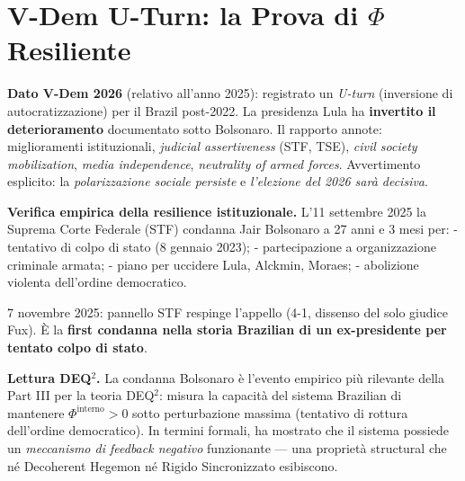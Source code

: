 \section{\texorpdfstring{V-Dem U-Turn: la Prova di \(\Phi\)
Resiliente}{V-Dem U-Turn: la Prova di \textbackslash Phi Resiliente}}\label{v-dem-u-turn-la-prova-di-phi-resilient}

\Proved{} \textbf{Dato V-Dem 2026} (relativo all'anno 2025): registrato
un \emph{U-turn} (inversione di autocratizzazione) per il Brazil
post-2022. La presidenza Lula ha \textbf{invertito il deterioramento}
documentato sotto Bolsonaro. Il rapporto annote: miglioramenti
istituzionali, \emph{judicial assertiveness} (STF, TSE), \emph{civil
society mobilization}, \emph{media independence}, \emph{neutrality of
armed forces}. Avvertimento esplicito: la \emph{polarizzazione sociale
persiste} e \emph{l'elezione del 2026 sarà decisiva}.

\Proved{} \textbf{Verifica empirica della resilience istituzionale.}
L'11 settembre 2025 la Suprema Corte Federale (STF) condanna Jair
Bolsonaro a 27 anni e 3 mesi per: - tentativo di colpo di stato (8
gennaio 2023); - partecipazione a organizzazione criminale armata; -
piano per uccidere Lula, Alckmin, Moraes; - abolizione violenta
dell'ordine democratico.

7 novembre 2025: pannello STF respinge l'appello (4-1, dissenso del solo
giudice Fux). È la \textbf{first condanna nella storia Brazilian di un
ex-presidente per tentato colpo di stato}.

\Hypoth{} \textbf{Lettura DEQ$^2$. } La condanna Bolsonaro è l'evento
empirico più rilevante della Part III per la teoria DEQ$^2$: misura la
capacità del sistema Brazilian di mantenere
\(\Phi^{\text{interno}} > 0\) sotto perturbazione massima (tentativo di
rottura dell'ordine democratico). In termini formali, ha mostrato che il
sistema possiede un \emph{meccanismo di feedback negativo} funzionante
--- una proprietà structural che né Decoherent Hegemon né Rigido
Sincronizzato esibiscono.


